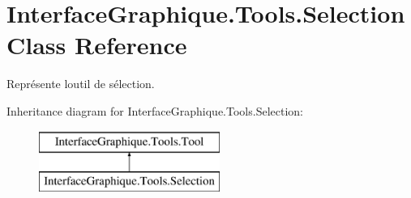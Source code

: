 \hypertarget{class_interface_graphique_1_1_tools_1_1_selection}{}\section{Interface\+Graphique.\+Tools.\+Selection Class Reference}
\label{class_interface_graphique_1_1_tools_1_1_selection}


Représente l\textquotesingle{}outil de sélection.  


Inheritance diagram for Interface\+Graphique.\+Tools.\+Selection\+:\begin{figure}[H]
\begin{center}
\leavevmode
\includegraphics[height=2.000000cm]{class_interface_graphique_1_1_tools_1_1_selection}
\end{center}
\end{figure}
